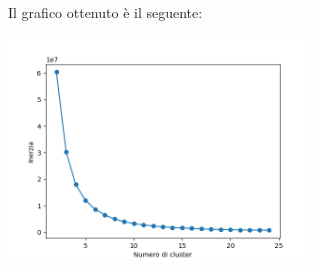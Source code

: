\documentclass[a4paper, 10pt]{report}
\begin{document}
                Il grafico ottenuto è il seguente:

                \begin{center}
                    \includegraphics[width=8cm]{evaluation/elbowPoint}\\
                \end{center}
\end{document}
